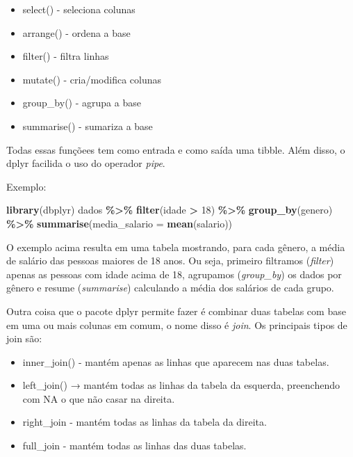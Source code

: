 \documentclass[
]{book}
\newenvironment{Shaded}{\begin{snugshade}}{\end{snugshade}}
\newcommand{\AttributeTok}[1]{\textcolor[rgb]{0.13,0.29,0.53}{#1}}
\newcommand{\DecValTok}[1]{\textcolor[rgb]{0.00,0.00,0.81}{#1}}
\newcommand{\FunctionTok}[1]{\textcolor[rgb]{0.13,0.29,0.53}{\textbf{#1}}}
\newcommand{\NormalTok}[1]{#1}
\newcommand{\SpecialCharTok}[1]{\textcolor[rgb]{0.81,0.36,0.00}{\textbf{#1}}}
\providecommand{\tightlist}{%
  \setlength{\itemsep}{0pt}\setlength{\parskip}{0pt}}
\begin{document}
\begin{itemize}
\tightlist
\item
  select() - seleciona colunas
\item
  arrange() - ordena a base
\item
  filter() - filtra linhas
\item
  mutate() - cria/modifica colunas
\item
  group\_by() - agrupa a base
\item
  summarise() - sumariza a base
\end{itemize}

Todas essas funçõees tem como entrada e como saída uma tibble. Além disso, o dplyr facilida o uso do operador \emph{pipe}.

Exemplo:

\begin{Shaded}
\begin{Highlighting}[]
\FunctionTok{library}\NormalTok{(dbplyr)}
\NormalTok{dados }\SpecialCharTok{\%\textgreater{}\%} 
  \FunctionTok{filter}\NormalTok{(idade }\SpecialCharTok{\textgreater{}} \DecValTok{18}\NormalTok{) }\SpecialCharTok{\%\textgreater{}\%} 
  \FunctionTok{group\_by}\NormalTok{(genero) }\SpecialCharTok{\%\textgreater{}\%} 
  \FunctionTok{summarise}\NormalTok{(}\AttributeTok{media\_salario =} \FunctionTok{mean}\NormalTok{(salario))}
\end{Highlighting}
\end{Shaded}

O exemplo acima resulta em uma tabela mostrando, para cada gênero, a média de salário das pessoas maiores de 18 anos. Ou seja, primeiro filtramos (\emph{filter}) apenas as pessoas com idade acima de 18, agrupamos (\emph{group\_by}) os dados por gênero e resume (\emph{summarise}) calculando a média dos salários de cada grupo.

Outra coisa que o pacote dplyr permite fazer é combinar duas tabelas com base em uma ou mais colunas em comum, o nome disso é \emph{join}. Os principais tipos de join são:

\begin{itemize}
\tightlist
\item
  inner\_join() - mantém apenas as linhas que aparecem nas duas tabelas.
\item
  left\_join() → mantém todas as linhas da tabela da esquerda, preenchendo com NA o que não casar na direita.
\item
  right\_join - mantém todas as linhas da tabela da direita.
\item
  full\_join - mantém todas as linhas das duas tabelas.
\end{itemize}
\end{document}
